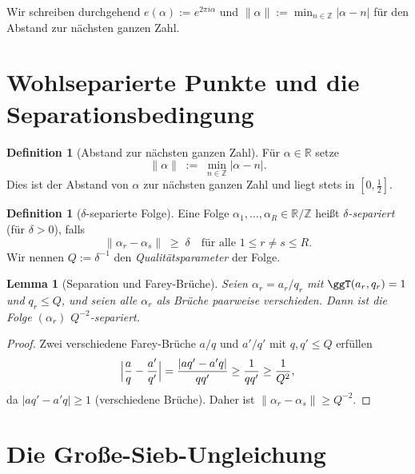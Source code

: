 \documentclass[12pt,a4paper]{amsart}
\newtheorem{lemma}[theorem]{Lemma}
\theoremstyle{definition}
\newtheorem{definition}[theorem]{Definition}
\newcommand{\Z}{\mathbb{Z}}
\newcommand{\R}{\mathbb{R}}
\newcommand{\eexp}[1]{e\!\left(#1\right)}
\begin{document}
Wir schreiben durchgehend $\eexp{\alpha} := e^{2\pi i\alpha}$ und
$\|\alpha\| := \min_{n\in\Z}|\alpha - n|$ für den Abstand zur nächsten
ganzen Zahl.

\section{Wohlseparierte Punkte und die Separationsbedingung}

\begin{definition}[Abstand zur nächsten ganzen Zahl]
  Für $\alpha \in \R$ setze
  \[
    \|\alpha\| \;:=\; \min_{n \in \Z}|\alpha - n|.
  \]
  Dies ist der Abstand von $\alpha$ zur nächsten ganzen Zahl und liegt
  stets in $[0, \tfrac{1}{2}]$.
\end{definition}

\begin{definition}[$\delta$-separierte Folge]\label{def:separiert}
  Eine Folge $\alpha_1, \ldots, \alpha_R \in \R/\Z$ heißt
  \emph{$\delta$-separiert} (für $\delta > 0$), falls
  \[
    \|\alpha_r - \alpha_s\| \;\geq\; \delta
    \quad \text{für alle } 1 \leq r \neq s \leq R.
  \]
  Wir nennen $Q := \delta^{-1}$ den \emph{Qualitätsparameter} der Folge.
\end{definition}

\begin{lemma}[Separation und Farey-Brüche]\label{lem:farey}
  Seien $\alpha_r = a_r/q_r$ mit $\ggT(a_r, q_r) = 1$ und $q_r \leq Q$,
  und seien alle $\alpha_r$ als Brüche paarweise verschieden.  Dann ist
  die Folge $(\alpha_r)$ $Q^{-2}$-separiert.
\end{lemma}

\begin{proof}
  Zwei verschiedene Farey-Brüche $a/q$ und $a'/q'$ mit $q, q' \leq Q$
  erfüllen
  \[
    \Bigl|\frac{a}{q} - \frac{a'}{q'}\Bigr|
    = \frac{|aq' - a'q|}{qq'}
    \geq \frac{1}{qq'}
    \geq \frac{1}{Q^2},
  \]
  da $|aq' - a'q| \geq 1$ (verschiedene Brüche).  Daher ist
  $\|\alpha_r - \alpha_s\| \geq Q^{-2}$.
\end{proof}

\section{Die Große-Sieb-Ungleichung}
\end{document}
